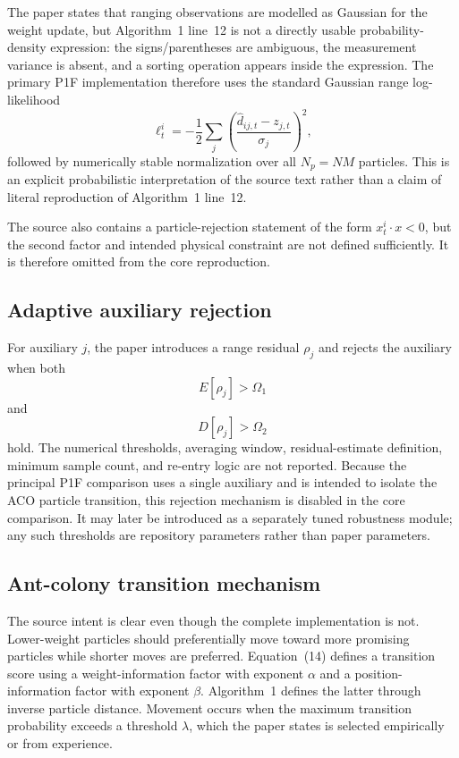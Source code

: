 The paper states that ranging observations are modelled as Gaussian for the weight update, but Algorithm~1 line~12 is not a directly usable probability-density expression: the signs/parentheses are ambiguous, the measurement variance is absent, and a sorting operation appears inside the expression. The primary P1F implementation therefore uses the standard Gaussian range log-likelihood
\begin{equation}
    \ell_t^i=-\frac{1}{2}\sum_j
    \left(\frac{\hat d_{ij,t}-z_{j,t}}{\sigma_j}\right)^2,
\end{equation}
followed by numerically stable normalization over all $N_p=NM$ particles. This is an explicit probabilistic interpretation of the source text rather than a claim of literal reproduction of Algorithm~1 line~12.

The source also contains a particle-rejection statement of the form $x_t^i\cdot x<0$, but the second factor and intended physical constraint are not defined sufficiently. It is therefore omitted from the core reproduction.

\subsection{Adaptive auxiliary rejection}
For auxiliary $j$, the paper introduces a range residual $\rho_j$ and rejects the auxiliary when both
\begin{equation}
    E[\rho_j]>\Omega_1
\end{equation}
and
\begin{equation}
    D[\rho_j]>\Omega_2
\end{equation}
hold. The numerical thresholds, averaging window, residual-estimate definition, minimum sample count, and re-entry logic are not reported. Because the principal P1F comparison uses a single auxiliary and is intended to isolate the ACO particle transition, this rejection mechanism is disabled in the core comparison. It may later be introduced as a separately tuned robustness module; any such thresholds are repository parameters rather than paper parameters.

\subsection{Ant-colony transition mechanism}
The source intent is clear even though the complete implementation is not. Lower-weight particles should preferentially move toward more promising particles while shorter moves are preferred. Equation~(14) defines a transition score using a weight-information factor with exponent $\alpha$ and a position-information factor with exponent $\beta$. Algorithm~1 defines the latter through inverse particle distance. Movement occurs when the maximum transition probability exceeds a threshold $\lambda$, which the paper states is selected empirically or from experience.

